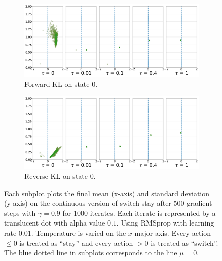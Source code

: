 \documentclass[\main/thesis.tex]{subfiles}
\begin{document}
\begin{figure}[!htb]
  \centering
  \begin{subfigure}[b]{0.85\linewidth}
    \centering
    \includegraphics[width=\columnwidth]{figs/continuous-switch-stay/notlearnQ/state0_pi_forward_optim=rmsprop_lr=0.01.png}
    \caption{Forward KL on state 0.}
    \label{fig:cont-switch-stay-forward-s0}
  \end{subfigure}\hspace{15pt}
  
  \begin{subfigure}[b]{0.85\linewidth}
        \centering
        \includegraphics[width=\columnwidth]{figs/continuous-switch-stay/notlearnQ/state0_pi_reverse_optim=rmsprop_lr=0.01.png}
        \caption{Reverse KL on state 0.}
        \label{fig:cont-switch-stay-reverse-s0}
  \end{subfigure}

  \caption{Each subplot plots the final mean (x-axis) and standard deviation (y-axis) on the continuous version of switch-stay after 500 gradient steps with $\gamma = 0.9$ for 1000 iterates. Each iterate is represented by a translucent dot with alpha value $0.1$. Using RMSprop with learning rate $0.01$. Temperature is varied on the $x$-major-axis. Every action $\leq 0$ is treated as ``stay'' and every action $> 0$ is treated as ``switch''. The blue dotted line in subplots corresponds to the line $\mu = 0$. }
  \label{fig:final-ss-probs-0}
\end{figure}
\end{document}
